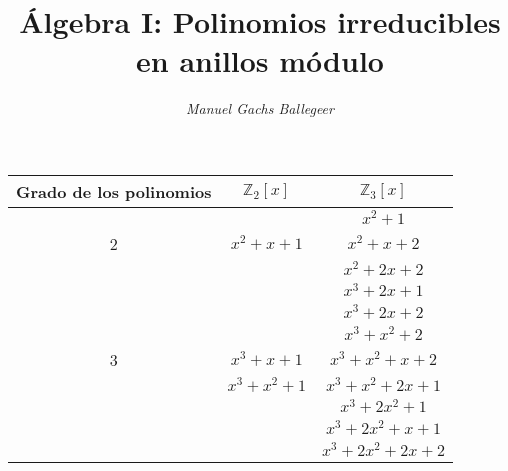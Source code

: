 \documentclass[11pt]{article}
\begin{document}
\title{\textbf{Álgebra I: Polinomios irreducibles en anillos módulo}}
\author{\textit{Manuel Gachs Ballegeer}}
\date{}
\maketitle

\begin{center}\begin{tabular}{ | c | c | c |}
	\hline
	Grado de los polinomios & $\mathbb{Z}_2[x]$ &  $\mathbb{Z}_3[x]$ \\ \hline
	  &  & $x^2+1$ \\
	2 & $x^2+x+1$ & $x^2+x+2$ \\
	  &  & $x^2+2x+2$ \\ \hline
	  &  & $x^3+2x+1$ \\
      &  & $x^3+2x+2$ \\
	  &  & $x^3+x^2+2$ \\
	3 & $x^3+x+1$ & $x^3+x^2+x+2$ \\
	  & $x^3+x^2+1$ & $x^3+x^2+2x+1$ \\
	  &  & $x^3+2x^2+1$ \\
	  &  & $x^3+2x^2+x+1$ \\
	  &  & $x^3+2x^2+2x+2$ \\ \hline
\end{tabular}\end{center}
\end{document}
